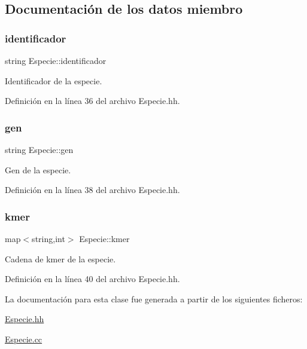 \subsection{Documentación de los datos miembro}
\mbox{\label{class_especie_a9efba6a1733042dab5c3cb63533e0628}} 
\subsubsection{\texorpdfstring{identificador}{identificador}}
{\footnotesize\ttfamily string Especie\+::identificador\hspace{0.3cm}{\ttfamily [private]}}



Identificador de la especie. 



Definición en la línea 36 del archivo Especie.\+hh.

\mbox{\label{class_especie_ac35bb565f7346cd6317b3a8c849456d1}} 
\subsubsection{\texorpdfstring{gen}{gen}}
{\footnotesize\ttfamily string Especie\+::gen\hspace{0.3cm}{\ttfamily [private]}}



Gen de la especie. 



Definición en la línea 38 del archivo Especie.\+hh.

\mbox{\label{class_especie_ab6740db160f2d7335a98fa8d9f745cbe}} 
\subsubsection{\texorpdfstring{kmer}{kmer}}
{\footnotesize\ttfamily map$<$string,int$>$ Especie\+::kmer\hspace{0.3cm}{\ttfamily [private]}}



Cadena de kmer de la especie. 



Definición en la línea 40 del archivo Especie.\+hh.



La documentación para esta clase fue generada a partir de los siguientes ficheros\+:\begin{DoxyCompactItemize}
\item 
\hyperlink{_especie_8hh}{Especie.\+hh}\item 
\hyperlink{_especie_8cc}{Especie.\+cc}\end{DoxyCompactItemize}
